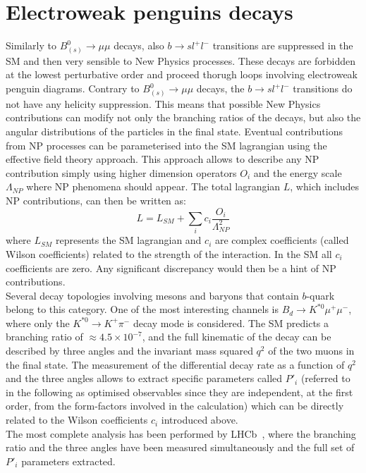 \section{Electroweak penguins decays}
Similarly to $B^0_{(s)} \to \mu \mu$ decays, also $b \to s l^+ l^-$ transitions are suppressed in the SM and then very sensible to New Physics processes. These decays are forbidden at the lowest perturbative order and proceed thorugh loops involving electroweak penguin diagrams. Contrary to $B^0_{(s)} \to \mu \mu$ decays, the $b \to s l^+ l^-$ transitions do not have any helicity suppression. This means that possible New Physics contributions can modify not only the branching ratios of the decays, but also the angular distributions of the particles in the final state. Eventual contributions from NP processes can be parameterised into the SM lagrangian using the effective field theory approach. This approach allows to describe any NP contribution simply using higher dimension operators $O_i$ and the energy scale $\Lambda_{NP}$ where NP phenomena should appear. The total lagrangian $L$, which includes NP contributions, can then be written as:
\begin{equation}
L = L_{SM}+\sum_i c_i \frac{O_i}{\Lambda^2_{NP}}
\label{eq:wilson}
\end{equation}
where $L_{SM}$ represents the SM lagrangian and $c_i$ are complex coefficients (called Wilson coefficients) related to the strength of the interaction. In the SM all $c_i$ coefficients are zero. Any significant discrepancy would then be a hint of NP contributions.\\
Several decay topologies involving mesons and baryons that contain $b$-quark belong to this category. One of the most interesting channels is $B_d \to K^{*0} \mu^+ \mu^-$, where only the $K^{*0} \to K^+ \pi^-$ decay mode is considered. The SM predicts a branching ratio of $\approx 4.5 \times 10^{-7}$, and the full kinematic of the decay can be described by three angles and the invariant mass squared $q^2$ of the two muons in the final state. The measurement of the differential decay rate as a function of $q^2$ and the three angles allows to extract specific parameters called $P'_i$ (referred to in the following as optimised observables since they are independent, at the first order, from the form-factors involved in the calculation) which can be directly related to the Wilson coefficients $c_i$ introduced above. \\
The most complete analysis has been performed by LHCb~\cite{mumuK_LHCb}, where the branching ratio and the three angles have been measured simultaneously and the full set of $P'_i$ parameters extracted.
